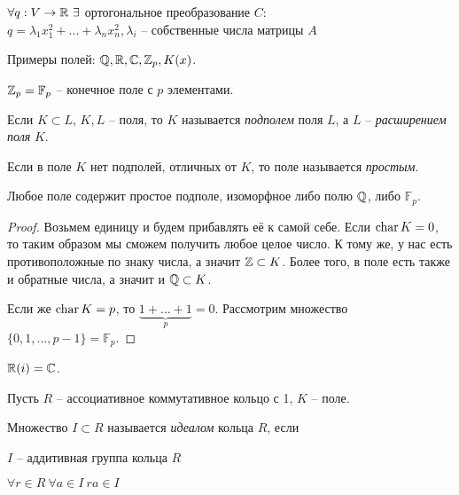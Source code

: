 \begin{Thm} 
	$\forall q: V \to \mathbb{R} \ \exists$ ортогональное преобразование $C:$\\
	$q = \lambda_1 x_1^2 + ... + \lambda_n x_n^2, \lambda_i$ -- собственные числа матрицы $A$
\end{Thm} 


\begin{Example}
	Примеры полей: $\mathbb{Q}, \mathbb{R}, \mathbb{C}, \mathbb{Z}_p, K(x)$. 
\end{Example}

\begin{notation}
	$\mathbb{Z}_p = \mathbb{F}_p$ -- конечное поле с $p$ элементами. 
\end{notation}

\begin{Def}
	Если $K \subset L$, $K, L$ -- поля, то $K$ называется \textit{подполем} поля $L$, а $L$ -- \textit{расширением поля} $K$.
\end{Def}

\begin{Def}
	Если в поле $K$ нет подполей, отличных от $K$, то поле называется \textit{простым}.
\end{Def}

\begin{Thm}
	Любое поле содержит простое подполе, изоморфное либо полю $\mathbb{Q}$, либо $\mathbb{F}_p$.
\end{Thm}

\begin{proof}
	Возьмем единицу и будем прибавлять её к самой себе. Если $\operatorname{char} K = 0$, то таким образом мы сможем получить любое целое число. К тому же, у нас есть противоположные по знаку числа, а значит $\mathbb{Z} \subset K$.
	Более того, в поле есть также и обратные числа, а значит и $\mathbb{Q} \subset K$.
	
	Если же $\operatorname{char} K = p$, то $\underbrace{1 + ... + 1}_p = 0$. Рассмотрим множество $\{0, 1, ..., p - 1\} = \mathbb{F}_p$. 
\end{proof}

\begin{Example}
	$\mathbb{R}(i) = \mathbb{C}$.
\end{Example}


Пусть $R$ -- ассоциативное коммутативное кольцо с 1, $K$ -- поле.

\begin{Def}
	Множество $I \subset R$ называется \textit{идеалом} кольца $R$, если 
	\begin{MyList}
		\item $I$ -- аддитивная группа кольца $R$
		\item $\forall r \in R \ \forall a \in I \ ra \in I$
	\end{MyList} 
\end{Def}

